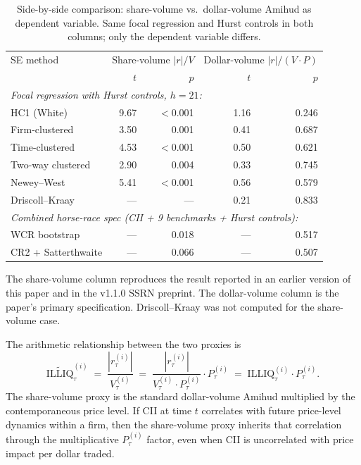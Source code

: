\documentclass[preprint,12pt,authoryear]{elsarticle}
\begin{document}
\begin{table}[H]
\centering
\begin{threeparttable}
\caption{Side-by-side comparison: share-volume vs.\ dollar-volume Amihud as dependent variable. Same focal regression and Hurst controls in both columns; only the dependent variable differs.}
\label{tab:diagnosis}
\begin{tabular}{lrrrr}
\toprule
SE method & \multicolumn{2}{c}{Share-volume $|r|/V$} & \multicolumn{2}{c}{Dollar-volume $|r|/(V\!\cdot\!P)$} \\
 & $t$ & $p$ & $t$ & $p$ \\
\midrule
\multicolumn{5}{l}{\emph{Focal regression with Hurst controls, $h = 21$:}} \\
HC1 (White) & 9.67 & $<$0.001 & 1.16 & 0.246 \\
Firm-clustered & 3.50 & 0.001 & 0.41 & 0.687 \\
Time-clustered & 4.53 & $<$0.001 & 0.50 & 0.621 \\
Two-way clustered & 2.90 & 0.004 & 0.33 & 0.745 \\
Newey--West & 5.41 & $<$0.001 & 0.56 & 0.579 \\
Driscoll--Kraay & --- & --- & 0.21 & 0.833 \\
\midrule
\multicolumn{5}{l}{\emph{Combined horse-race spec (CII + 9 benchmarks + Hurst controls):}} \\
WCR bootstrap & --- & 0.018 & --- & 0.517 \\
CR2 + Satterthwaite & --- & 0.066 & --- & 0.507 \\
\bottomrule
\end{tabular}
\begin{tablenotes}
\small
\item The share-volume column reproduces the result reported in an earlier version of this paper and in the v1.1.0 SSRN preprint. The dollar-volume column is the paper's primary specification. Driscoll--Kraay was not computed for the share-volume case.
\end{tablenotes}
\end{threeparttable}
\end{table}

The arithmetic relationship between the two proxies is
\begin{equation}
\widetilde{\mathrm{ILLIQ}}^{(i)}_\tau \;=\; \frac{|r^{(i)}_\tau|}{V^{(i)}_\tau} \;=\; \frac{|r^{(i)}_\tau|}{V^{(i)}_\tau \cdot P^{(i)}_\tau} \cdot P^{(i)}_\tau \;=\; \mathrm{ILLIQ}^{(i)}_\tau \cdot P^{(i)}_\tau.
\label{eq:decomp}
\end{equation}
The share-volume proxy is the standard dollar-volume Amihud multiplied by the contemporaneous price level. If CII at time $t$ correlates with future price-level dynamics within a firm, then the share-volume proxy inherits that correlation through the multiplicative $P^{(i)}_\tau$ factor, even when CII is uncorrelated with price impact per dollar traded.
\end{document}
